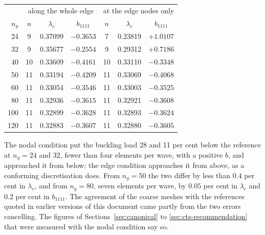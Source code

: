 \documentclass[11pt,a4paper]{article}
\begin{document}
\begin{center}
\begin{tabular}{rcccccc}
\toprule
 & \multicolumn{3}{c}{along the whole edge} & \multicolumn{3}{c}{at the edge nodes only} \\
$n_y$ & $n$ & $\lambda_c$ & $b_{1111}$ & $n$ & $\lambda_c$ & $b_{1111}$ \\
\midrule
 24 &  9 & 0.37099 & $-0.3653$ &  7 & 0.23819 & $+1.0107$ \\
 32 &  9 & 0.35677 & $-0.2554$ &  9 & 0.29312 & $+0.7186$ \\
 40 & 10 & 0.33609 & $-0.4161$ & 10 & 0.33110 & $-0.3348$ \\
 50 & 11 & 0.33194 & $-0.4209$ & 11 & 0.33069 & $-0.4068$ \\
 60 & 11 & 0.33054 & $-0.3546$ & 11 & 0.33003 & $-0.3525$ \\
 80 & 11 & 0.32936 & $-0.3615$ & 11 & 0.32921 & $-0.3608$ \\
100 & 11 & 0.32899 & $-0.3628$ & 11 & 0.32893 & $-0.3624$ \\
120 & 11 & 0.32883 & $-0.3607$ & 11 & 0.32880 & $-0.3605$ \\
\bottomrule
\end{tabular}
\end{center}

The nodal condition put the buckling load 28 and 11 per cent below the
reference at $n_y = 24$ and $32$, fewer than four elements per wave, with a
positive $b$, and approached it from below; the edge condition approaches it
from above, as a conforming discretisation does.  From $n_y = 50$ the two
differ by less than $0.4$ per cent in $\lambda_c$, and from $n_y = 80$, seven
elements per wave, by $0.05$ per cent in $\lambda_c$ and $0.2$ per cent in
$b_{1111}$.  The agreement of the coarse meshes with the references quoted in
earlier versions of this document came partly from the two errors
cancelling.  The figures of Sections~\ref{sec:canonical} to
\ref{sec:cts-recommendation} that were measured with the nodal condition say
so.
\end{document}

